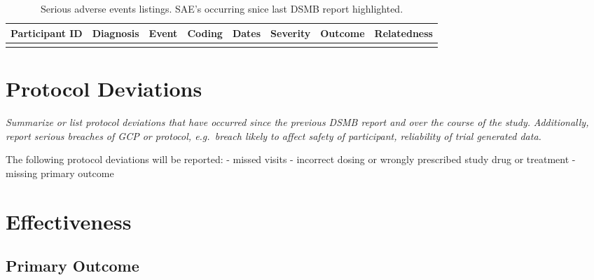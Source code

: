 \documentclass[
  11pt,
]{article}
\begin{document}
\begin{landscape}\begingroup\fontsize{8}{10}\selectfont

\begin{longtable}[t]{>{\raggedright\arraybackslash}p{2cm}>{\raggedright\arraybackslash}p{1.5cm}>{\raggedright\arraybackslash}p{1.5cm}>{\raggedright\arraybackslash}p{1.5cm}>{\raggedright\arraybackslash}p{4cm}>{\raggedright\arraybackslash}p{2cm}>{\raggedright\arraybackslash}p{2cm}>{\raggedright\arraybackslash}p{2cm}}
\caption{\label{tab:unnamed-chunk-10}Serious adverse events listings. SAE's occurring snice last DSMB report highlighted.}\\
\toprule
Participant ID & Diagnosis & Event & Coding & Dates & Severity & Outcome & Relatedness\\
\midrule
\cellcolor{yellow}{Pxxxxx} & \cellcolor{yellow}{xx} & \cellcolor{yellow}{xx} & \cellcolor{yellow}{xx} & \cellcolor{yellow}{xxxx-xx-xx - xxxx-xx-xx} & \cellcolor{yellow}{Severe} & \cellcolor{yellow}{Resolved} & \cellcolor{yellow}{Definite}\\
\bottomrule
\end{longtable}
\endgroup{}
\end{landscape}

\clearpage

\hypertarget{protocol-deviations}{%
\section{Protocol Deviations}\label{protocol-deviations}}

\emph{Summarize or list protocol deviations that have occurred since the previous DSMB report and over the course of the study.}
\emph{Additionally, report serious breaches of GCP or protocol, e.g.~breach likely to affect safety of participant, reliability of trial generated data.}

The following protocol deviations will be reported:
- missed visits
- incorrect dosing or wrongly prescribed study drug or treatment
- missing primary outcome

\clearpage

\hypertarget{effectiveness}{%
\section{Effectiveness}\label{effectiveness}}

\hypertarget{primary-outcome}{%
\subsection{Primary Outcome}\label{primary-outcome}}
\end{document}
